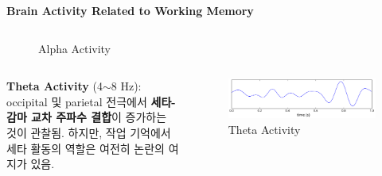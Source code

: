 \documentclass{beamer}
\begin{document}
\begin{frame}{\textbf{Brain Activity Related to Working Memory}}
\begin{columns}
\begin{column}{0.48\textwidth}
\begin{figure}
        \caption{Alpha Activity}
      \end{figure}
    \end{column}
  \end{columns}
  \vspace{-1em}
  \begin{columns}
    \begin{column}{0.52\textwidth}
      \large
      \textbf{Theta Activity} (4$\sim$8 Hz):\\occipital 및 parietal 전극에서 \textbf{세타-감마 교차 주파수 결합}이 증가하는 것이 관찰됨. 하지만, 작업 기억에서 세타 활동의 역할은 여전히 논란의 여지가 있음.
    \end{column}
    \hfill
    \begin{column}{0.48\textwidth}
      \centering
      \begin{figure}
        \centering
        \includegraphics[width=\textwidth]{image/theta}
        \caption{Theta Activity}
      \end{figure}
    \end{column}
  \end{columns}
\end{frame}
\end{document}
